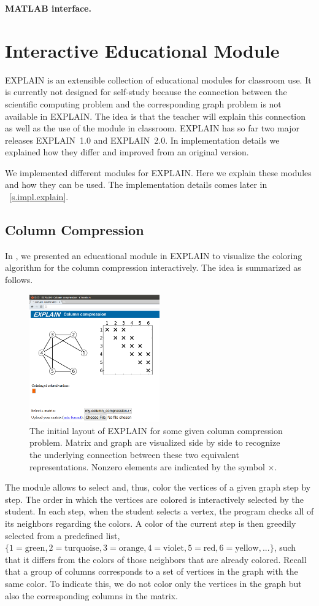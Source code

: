 \documentclass[12pt, twoside]{book}
\begin{document}
\textbf{MATLAB interface.}

\chapter{Interactive Educational Module}
\label{explain}
\mbox{EXPLAIN} is an extensible collection of educational modules for classroom use.
It is currently not designed for self-study because the connection between the scientific computing problem and the corresponding graph problem is not available in \mbox{EXPLAIN}. The idea is that the teacher will explain this connection as well as the use of the module in classroom.
EXPLAIN has so far two major releases \mbox{EXPLAIN 1.0} and \mbox{EXPLAIN 2.0}.
In implementation details we explained how they differ and improved from an original version.

We implemented different modules for EXPLAIN.
Here we explain these modules and how they can be used.
The implementation details comes later in ~\ref{s.impl.explain}.
\section{Column Compression}
\label{s.column-compression}
In \cite{2013:05,2014:01}, we presented an educational module in \mbox{EXPLAIN} to visualize the
coloring algorithm for the column compression interactively. The idea is
summarized as follows.

\begin{figure}
\centering
\includegraphics[width=0.5\textwidth]{fig1.png}
\caption{The initial layout of EXPLAIN for some given column compression problem. Matrix and graph are visualized side by side to recognize the underlying connection between these two equivalent representations. Nonzero elements are indicated by the symbol $\times$.
}
\label{fig1}
\end{figure}
The module allows to select and, thus, color the vertices of a given graph step by step. The order in which the vertices are colored is interactively selected by the student. In each step, when the student selects a vertex, the program checks all of its neighbors regarding the colors. A color of the current step is then greedily selected from a predefined list, $\{1=\text{green}, 2=\text{turquoise}, 3=\text{orange}, 4=\text{violet}, 5=\text{red}, 6=\text{yellow}, ...\}$, such that it differs from the colors of those neighbors that are already colored. Recall that a group of columns corresponds to a set of vertices in the graph with the same color. To indicate this, we do not color only the vertices in the graph but also the corresponding columns in the matrix.
\end{document}
